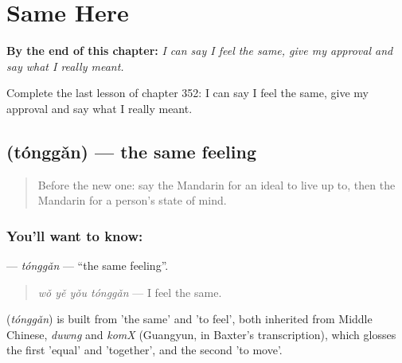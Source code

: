 
\chapter{Same Here}
\label{ch:zh-same-here}

\begin{chapteropening}
\textbf{By the end of this chapter:} \emph{I can say I feel the same, give my approval and say what I really meant.}

Complete the last lesson of chapter 352: I can say I feel the same, give my approval and say what I really meant.
\end{chapteropening}

\section[\texorpdfstring{\zh{同感} (tónggǎn)}{同感 (tónggǎn)}]{ (tónggǎn) — the same feeling}

\label{lesson:ZH-C352-tonggan}



\begin{quote}
Before the new one: say the Mandarin for an ideal to live up to, then the Mandarin for a person's state of mind.
\end{quote}

\subsection*{You'll want to know: }
\textbf{} — \emph{tónggǎn} — \textquotedblleft{}the same feeling\textquotedblright{}.

\begin{quote}
\textbf{} \emph{wǒ yě yǒu tónggǎn} — I feel the same.
\end{quote}

\begin{cousinweb}
\textbf{} (\emph{tónggǎn}) is built from  'the same' and  'to feel', both inherited from Middle Chinese, \emph{duwng} and \emph{komX} (Guangyun, in Baxter's transcription), which glosses the first 'equal' and 'together', and the second 'to move'.
\end{cousinweb}

